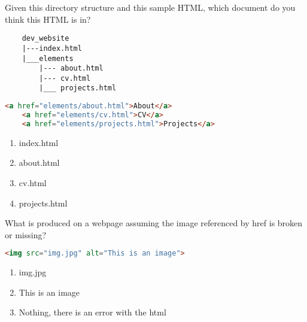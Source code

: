 \documentclass{beamer}
\begin{document}
%
%
\begin{frame}[fragile]
  Given this directory structure and this sample HTML, which document do you think this HTML is in?\\
  \begin{minipage}{0.65\textwidth}
    \begin{lstlisting}
    dev_website
    |---index.html
    |___elements
        |--- about.html
        |--- cv.html
        |___ projects.html
    \end{lstlisting} 
    \hfill
    \begin{lstlisting}[language=html, basicstyle=\scriptsize]
    <a href="elements/about.html">About</a>
    <a href="elements/cv.html">CV</a>
    <a href="elements/projects.html">Projects</a>
    \end{lstlisting} 
  \end{minipage}
  \hfill
  \begin{minipage}{0.3\textwidth}
    \begin{enumerate}[A]
      \item index.html
      \item about.html
      \item cv.html
      \item projects.html
    \end{enumerate}
  \end{minipage}
\end{frame}
%
%
\begin{frame}[fragile]
  \begin{minipage}{0.49\textwidth}
  What is produced on a webpage assuming the image referenced by href is broken or missing?
  \begin{lstlisting}[language=html, basicstyle=\scriptsize]
  <img src="img.jpg" alt="This is an image">
  \end{lstlisting} 
  \end{minipage}
  \hfill
  \begin{minipage}{0.39\textwidth}
    \begin{enumerate}[A]
      \item img.jpg
      \item This is an image
      \item Nothing, there is an error with the html
    \end{enumerate}
  \end{minipage}
\end{frame}
\end{document}
